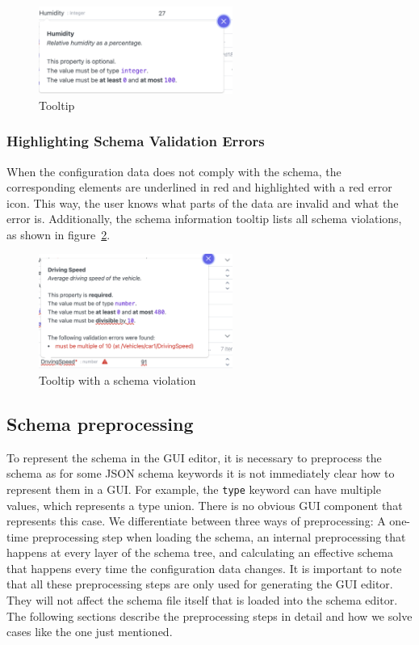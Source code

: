 \begin{figure}[hbt]
    \centering
    \includegraphics[width=2.5in]{figures/Tooltip_example}
    \caption{Tooltip}
    \label{fig:tooltip_example}
\end{figure}

\subsubsection{Highlighting Schema Validation Errors}
When the configuration data does not comply with the schema, the corresponding elements are underlined in red and highlighted with a red error icon.
This way, the user knows what parts of the data are invalid and what the error is.
Additionally, the schema information tooltip lists all schema violations, as shown in figure~\ref{fig:schema_violation}.

\begin{figure}[hbt]
    \centering
    \includegraphics[width=2.5in]{figures/schema_violation}
    \caption{Tooltip with a schema violation}
    \label{fig:schema_violation}
\end{figure}

\subsection{Schema preprocessing}\label{subsec:schema-preprocessing}

To represent the schema in the GUI editor, it is necessary to preprocess the schema as for some JSON schema keywords
it is not immediately clear how to represent them in a GUI\@.
For example, the \texttt{type} keyword can have multiple values, which represents a type union.
There is no obvious GUI component that represents this case.
We differentiate between three ways of preprocessing:
A one-time preprocessing step when loading the schema, an internal preprocessing that happens at every layer of the schema tree,
and calculating an effective schema that happens every time the configuration data changes.
It is important to note that all these preprocessing steps are only used for generating the GUI editor.
They will not affect the schema file itself that is loaded into the schema editor.
The following sections describe the preprocessing steps in detail and how we solve cases like the one just mentioned.

